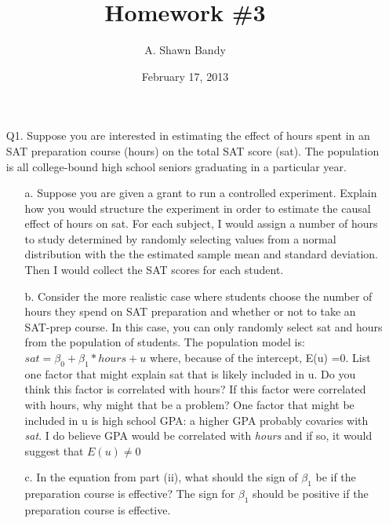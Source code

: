 \documentclass{article}
\begin{document}
\title{Homework \#3}
\author{A. Shawn Bandy}
\date{February 17, 2013}
\maketitle
\begin{enumerate}
\item[Q1.] Suppose you are interested in estimating the effect of hours spent in an SAT preparation course (hours) on the total SAT score (sat). The population is all college-bound high school seniors graduating in a particular year.
\begin{enumerate}
\item[a.]Suppose you are given a grant to run a controlled experiment. Explain how you would structure the experiment in order to estimate the causal effect of hours on sat. 
\newline\newline
For each subject, I would assign a number of hours to study determined by randomly selecting values from a normal distribution with the the estimated sample mean and standard deviation.  Then I would collect the SAT scores for each student.
\newline
\item[b.]Consider the more realistic case where students choose the number of hours they spend on SAT preparation and whether or not to take an SAT-prep course. In this case, you can only randomly select sat and hours from the population of students.  The population model is: $sat = \beta_0 + \beta_1 * hours + u$ where, because of the intercept, E(u) =0. List one factor that might explain sat that is likely included in u. Do you think this factor is correlated with hours? If this factor were correlated with hours, why might that be a problem? 
\newline\newline
One factor that might be included in u is high school GPA: a higher GPA probably covaries with {\it{sat}}.  I do believe GPA would be correlated with {\it{hours}} and if so, it would suggest that $E(u) \neq 0$
\newline
\item[c.]In the equation from part (ii), what should the sign of $\beta_1$ be if the preparation course is effective?
\newline\newline
The sign for $\beta_1$ should be positive if the preparation course is effective.
\newline
\end{enumerate}

\end{enumerate}
\end{document}
